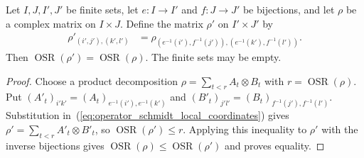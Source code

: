 \begin{theorem}
    \label{thm:operator_schmidt_local_reindex}
    \leanok
    Let $I,J,I',J'$ be finite sets, let $e:I\to I'$ and $f:J\to J'$ be
    bijections, and let $\rho$ be a complex matrix on $I\times J$.
    Define the matrix $\rho'$ on $I'\times J'$ by
    \begin{align}
        \rho'_{(i',j'),(k',l')}
         & =\rho_{(e^{-1}(i'),f^{-1}(j')),(e^{-1}(k'),f^{-1}(l'))}.
        \label{eq:operator_schmidt_local_coordinates}
    \end{align}
    Then $\operatorname{OSR}(\rho')=\operatorname{OSR}(\rho)$.
    The finite sets may be empty.
\end{theorem}
\begin{proof}\leanok
    Choose a product decomposition $\rho=\sum_{t<r}A_t\otimes B_t$ with
    $r=\operatorname{OSR}(\rho)$. Put
    $(A'_t)_{i'k'}=(A_t)_{e^{-1}(i'),e^{-1}(k')}$ and
    $(B'_t)_{j'l'}=(B_t)_{f^{-1}(j'),f^{-1}(l')}$.
    Substitution in~(\ref{eq:operator_schmidt_local_coordinates}) gives
    $\rho'=\sum_{t<r}A'_t\otimes B'_t$, so
    $\operatorname{OSR}(\rho')\le r$.
    Applying this inequality to $\rho'$ with the inverse bijections gives
    $\operatorname{OSR}(\rho)\le\operatorname{OSR}(\rho')$ and proves equality.
\end{proof}

